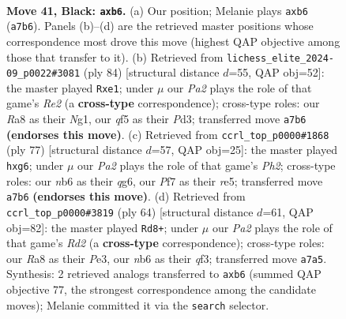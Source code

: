 \documentclass[11pt]{article}
\begin{document}
\clearpage

\begin{figure}[p]\centering
\begin{subfigure}{0.46\textwidth}\centering
\resizebox{\linewidth}{!}{%
\newchessgame
\chessboard[
  setfen={r5r1/pk3p1p/1Np5/5Q2/3P4/1R4PP/5P2/6K1 b - - 0 41},
  showmover=false,
  pgfstyle=straightmove, color=movearrow, markmove={a7-b6}
]}
\caption{}
\end{subfigure}\hfill
\begin{subfigure}{0.46\textwidth}\centering
\resizebox{\linewidth}{!}{%
\newchessgame
\chessboard[
  setfen={6k1/8/7p/ppq3p1/4PpP1/3P4/PP2R3/4nKN1 w - - 0 43},
  showmover=false,
  pgfstyle=straightmove, color=movearrow, markmove={e2-e1}
]}
\caption{}
\end{subfigure}
\\[4pt]
\begin{subfigure}{0.46\textwidth}\centering
\resizebox{\linewidth}{!}{%
\newchessgame
\chessboard[
  setfen={3r3k/2p3rp/6Q1/4R3/B7/6Pp/1P2PP1P/6K1 b - - 0 39},
  showmover=false,
  pgfstyle=straightmove, color=movearrow, markmove={h7-g6}
]}
\caption{}
\end{subfigure}\hfill
\begin{subfigure}{0.46\textwidth}\centering
\resizebox{\linewidth}{!}{%
\newchessgame
\chessboard[
  setfen={N1r3k1/4pp1p/p5p1/Q7/1P6/4Pq2/3R1n1P/3R2K1 w - - 0 33},
  showmover=false,
  pgfstyle=straightmove, color=movearrow, markmove={d2-d8}
]}
\caption{}
\end{subfigure}
\caption{\textbf{Move 41, Black: \texttt{axb6}.} (a) Our position; Melanie plays \texttt{axb6} (\texttt{a7b6}). Panels (b)--(d) are the retrieved master positions whose correspondence most drove this move (highest QAP objective among those that transfer to it). (b) Retrieved from \texttt{lichess\_elite\_2024-09\_p0022\#3081} (ply 84) [structural distance $d$=55, QAP obj=52]: the master played \texttt{Rxe1}; under $\mu$ our \emph{Pa2} plays the role of that game's \emph{Re2} (a \textbf{cross-type} correspondence); cross-type roles: our \emph{R}a8 as their \emph{N}g1, our \emph{q}f5 as their \emph{P}d3; transferred move \texttt{a7b6} \textbf{(endorses this move)}. (c) Retrieved from \texttt{ccrl\_top\_p0000\#1868} (ply 77) [structural distance $d$=57, QAP obj=25]: the master played \texttt{hxg6}; under $\mu$ our \emph{Pa2} plays the role of that game's \emph{Ph2}; cross-type roles: our \emph{n}b6 as their \emph{q}g6, our \emph{P}f7 as their \emph{r}e5; transferred move \texttt{a7b6} \textbf{(endorses this move)}. (d) Retrieved from \texttt{ccrl\_top\_p0000\#3819} (ply 64) [structural distance $d$=61, QAP obj=82]: the master played \texttt{Rd8+}; under $\mu$ our \emph{Pa2} plays the role of that game's \emph{Rd2} (a \textbf{cross-type} correspondence); cross-type roles: our \emph{R}a8 as their \emph{P}e3, our \emph{n}b6 as their \emph{q}f3; transferred move \texttt{a7a5}. Synthesis: 2 retrieved analogs transferred to \texttt{axb6} (summed QAP objective 77, the strongest correspondence among the candidate moves); Melanie committed it via the \texttt{search} selector.}
\label{fig:thought-m81}
\end{figure}
\end{document}
